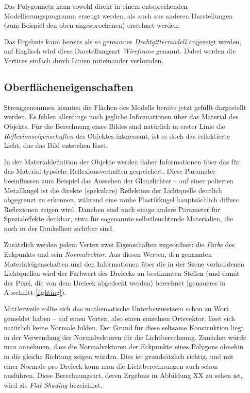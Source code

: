 Das Polygonnetz kann sowohl direkt in einem entsprechenden Modellierungsprogramm erzeugt werden, als auch aus anderen Darstellungen (zum Beispiel den oben angesprochenen) errechnet werden.

Das Ergebnis kann bereits als so gennantes \emph{Drahtgittermodell} angezeigt werden, auf Englisch wird diese Darstellungsart \emph{Wireframe} genannt. Dabei werden die Vertices einfach durch Linien miteinander verbunden.


\subsection{Oberflächeneigenschaften}
Strenggenommen könnten die Flächen des Modells bereits jetzt gefüllt dargestellt werden. Es fehlen allerdings noch jegliche Informationen über das Material des Objekts. Für die Berechnung eines Bildes sind natürlich in erster Linie die \emph{Reflexionseigenschaften} des Objektes interessant, ist es doch das reflektierte Licht, das das Bild entstehen lässt.

In der Materialdefinition der Objekte werden daher Informationen über das für das Material typsiche Reflexionsverhalten gespeichert. Diese Parameter beeinflussen zum Beispiel das Aussehen der Glanzlichter -- auf einer polierten Metallkugel ist die direkte (spekulare) Reflektion der Lichtquelle deutlich abgegrenzt zu erkennen, während eine rauhe Plastikkugel hauptsächlich diffuse Reflexionen zeigen wird. Daneben sind noch einige andere Parameter für Spezialeffekte denkbar, etwa für sogenannte selbstleuchtende Materialien, die auch in der Dunkelheit sichtbar sind.

Zusätzlich werden jedem Vertex zwei Eigenschaften zugeordnet: die \emph{Farbe} des Eckpunkts und sein \emph{Normalvektor}. Aus diesen Werten, den genannten Materialeigenschaften und den Informationen über die in der Szene vorhandenen Lichtquellen wird der Farbwert des Dreiecks an bestimmten Stellen (und damit der Pixel, die von dem Dreieck abgedeckt werden) berechnet (genaueres in Abschnitt \ref{lighting}).

Mittlerweile sollte sich das mathematische Unterbewusstsein schon zu Wort gemeldet haben -- auf einen Vertex, also einen einzelnen Ortsvektor, lässt sich natürlich keine Normale bilden. Der Grund für diese seltsame Konstruktion liegt in der Verwendung der Normalvektoren für die Lichtberechnung. Zunächst würde man annehmen, dass die Normalvektoren der Eckpunkte eines Polygons ohnehin in die gleiche Richtung zeigen würden. Dies ist grundsätzlich richtig, und mit einer Normale pro Dreieck kann man die Lichtberechnungen auch schon ausführen. Diese Berechnungsart, deren Ergebnis in Abbildung XX zu sehen ist, wird als \emph{Flat Shading} bezeichnet.

